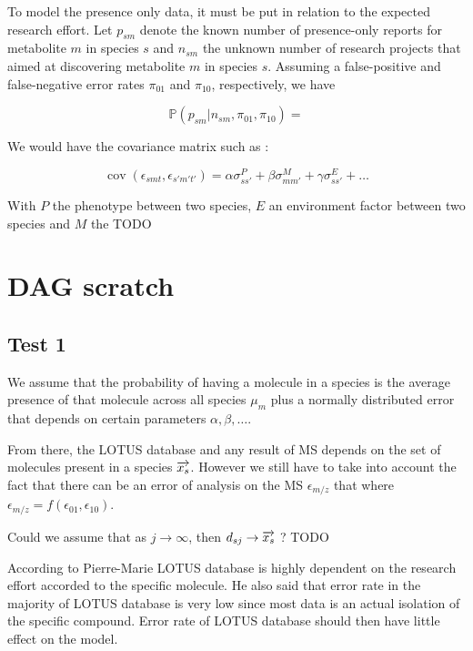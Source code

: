 \documentclass[a4paper,10pt]{article}
\DeclareMathOperator{\cov}{cov}
\def\P{\mathbb{P}}
\begin{document}
	To model the presence only data, it must be put in relation to the expected research effort. Let $p_{sm}$ denote the known number of presence-only reports for metabolite $m$ in species $s$ and $n_{sm}$ the unknown number of research projects that aimed at discovering metabolite $m$ in species $s$. Assuming a false-positive and false-negative error rates $\pi_{01}$ and $\pi_{10}$, respectively, we have
	
	\begin{equation*}
	 \P(p_{sm}|n_{sm}, \pi_{01}, \pi_{10}) = 
	\end{equation*}
	
	
	We would have the covariance matrix such as :
	
	\begin{equation}
		\cov (\epsilon_{smt}, \epsilon_{s'm't'}) = \alpha \sigma_{ss'}^P + \beta \sigma_{mm'}^M + \gamma \sigma_{ss'}^E + \ldots
	\end{equation}
	
	With $P$ the phenotype between two species, $E$ an environment factor between two species and $M$ the TODO 

\section{DAG scratch}
\subsection{Test 1}
We assume that the probability of having a molecule in a species is the average presence of that molecule across all species $\mu_m$ plus a normally distributed error that depends on certain parameters $\alpha, \beta, \ldots$. 

From there, the LOTUS database and any result of MS depends on the set of molecules present in a species $\overrightarrow{\boldmath{x_s}}$. However we still have to take into account the fact that there can be an error of analysis on the MS $\epsilon_{m/z}$ that where $\epsilon_{m/z} = f(\epsilon_{01}, \epsilon_{10})$. 

Could we assume that as $j \rightarrow \infty$, then $d_{sj} \rightarrow \overrightarrow{\boldmath{x_s}}$ ?  TODO

According to Pierre-Marie LOTUS database is highly dependent on the research effort accorded to the specific molecule. He also said that error rate in the majority of LOTUS database is very low since most data is an actual isolation of the specific compound. Error rate of LOTUS database should then have little effect on the model. \\
\end{document}
